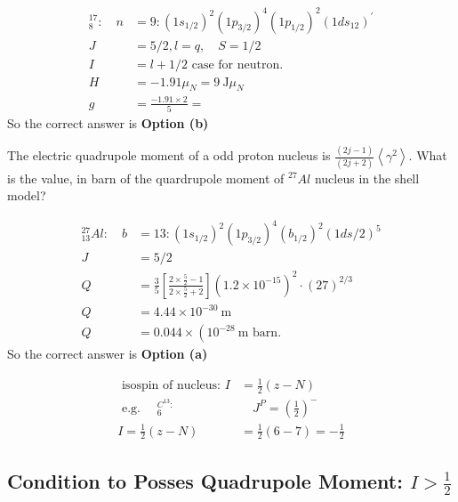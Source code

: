 \begin{answer}
	\begin{align*}
	{ }_{8}^{17}: \quad n&=9:\left(1 s_{1 / 2}\right)^{2}\left(1 p_{3 / 2}\right)^{4}\left(1 p_{1 / 2}\right)^{2}\left(1 d s_{12}\right)^{\prime}\\
	J&=5 / 2, l=q, \quad S=1 / 2\\
	I&=l+1 / 2 \text { case for neutron. }\\
	H&=-1.91 \mu_{N}=9 \mathrm{~J} \mu_{N}\\
	g&=\frac{-1.91 \times 2}{5}=
	\end{align*}
	So the correct answer is \textbf{Option (b)}
\end{answer}
\begin{exercise}
	The electric quadrupole moment of a odd proton nucleus is $\frac{(2 j-1)}{(2 j+2)}\left\langle\gamma^{2}\right\rangle$. What is the value, in barn of the quardrupole moment of ${}^{27}Al$ nucleus in the shell model?
\end{exercise}
\begin{answer}
	\begin{align*}
	{ }_{13}^{27} A l: \quad b&=13:\left(1 s_{1 / 2}\right)^{2}\left(1 p_{3 / 2}\right)^{4}\left(b_{1 / 2}\right)^{2}(1 d s / 2)^{5}\\
	J&=5 / 2\\
	Q&=\frac{3}{5}\left[\frac{2 \times \frac{5}{2}-1}{2 \times \frac{5}{2}+2}\right]\left(1.2 \times 10^{-15}\right)^{2} \cdot(27)^{2 / 3}\\
	Q&=4.44 \times 10^{-30} \mathrm{~m}\\
	Q&=0.044 \times\left(10^{-28} \mathrm{~m}\right. \text { barn. }
	\end{align*}
	So the correct answer is \textbf{Option (a)}
\end{answer}
\begin{note}
	\begin{align*}
	\text { isospin of nucleus: } I&=\frac{1}{2}(z-N)\\
	\text { e.g. } \quad{ }_{6}^{C^{13}:} &\quad J^{P}=\left(\frac{1}{2}\right)^{-}\\
	I=\frac{1}{2}(z-N)&=\frac{1}{2}(6-7)=-\frac{1}{2}
	\end{align*}
\end{note}
\subsection{Condition to Posses Quadrupole Moment: $I>\frac{1}{2}$}
